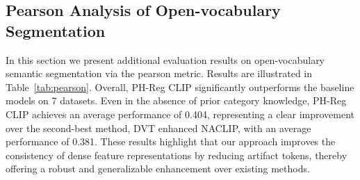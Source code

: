 \documentclass{article}
\begin{document}
\subsection{Pearson Analysis of Open-vocabulary Segmentation}\label{pearson}

\renewcommand{\arraystretch}{1.2}
\begin{table}[h]
\centering
\caption{\textbf{Open-vocabulary Semantic Segmentation Quantitative Comparison on 7 datasets.} We report the Pearson correlation coefficient for the zero-shot query against the one-hot ground truth labels. The results are averaged within each image, then averaged across images. Compared to mIoU, pearson does not require knowledge of all of the categories present an image (via softmax). The value ranges from -1 to 1, where 1 = perfect positive correlation, -1 = perfect negative correlation, and 0 = no linear correlation. The best result for each dataset is highlighted in \textbf{bolded}.}
\vspace{.1cm}
\vspace{-.2cm}
\label{tab:pearson}
\end{table}
In this section we present additional evaluation results on open-vocabulary semantic segmentation via the pearson metric. Results are illustrated in Table~\ref{tab:pearson}. Overall, PH-Reg CLIP significantly outperforms the baseline models on 7 datasets. Even in the absence of prior category knowledge, PH-Reg CLIP achieves an average performance of 0.404, representing a clear improvement over the second-best method, DVT enhanced NACLIP, with an average performance of 0.381. 
These results highlight that our approach improves the consistency of dense feature representations by reducing artifact tokens, thereby offering a robust and generalizable enhancement over existing methods.
\end{document}
